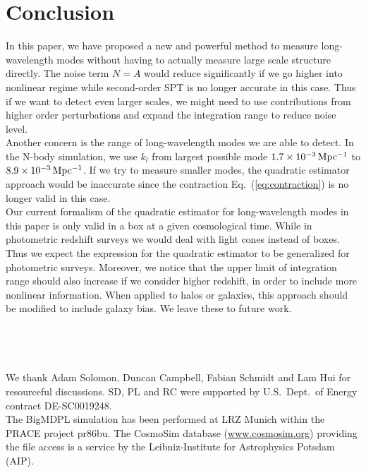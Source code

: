 \documentclass[prd,amsmath,amssymb,floatfix,superscriptaddress,nofootinbib,twocolumn]{revtex4-1}
\newcommand{\ec}[1]{Eq.~(\ref{eq:#1})}
\begin{document}
\section{Conclusion}\label{sec4}
In this paper, we have proposed a new and powerful method to measure long-wavelength modes without having to actually measure large scale structure directly. The noise term $N=A$ would reduce significantly if we go higher into nonlinear regime while second-order SPT is no longer accurate in this case. Thus if we want to detect even larger scales, we might need to use contributions from higher order perturbations and expand the integration range to reduce noise level. \\
Another concern is the range of long-wavelength modes we are able to detect. In the N-body simulation, we use $k_l$ from largest possible mode $1.7 \times 10^{-3} \, \rm Mpc^{-1}$ to $8.9\times 10^{-3} \, \rm Mpc^{-1}$. If we try to measure smaller modes, the quadratic estimator approach would be inaccurate since the contraction \ec{contraction} is no longer valid in this case.\\
Our current formalism of the quadratic estimator for long-wavelength modes in this paper is only valid in a box at a given cosmological time. While in photometric redshift surveys we would deal with light cones instead of boxes. Thus we expect the expression for the quadratic estimator to be generalized for photometric surveys. Moreover, we notice that the upper limit of integration range should also increase if we consider higher redshift, in order to include more nonlinear information. When applied to halos or galaxies, this approach should be modified to include galaxy bias. We leave these to future work.\\
\\ \\ \\ \\

\acknowledgements
\noindent We thank Adam Solomon, Duncan Campbell, Fabian Schmidt and Lam Hui for resourceful discussions.  SD, PL and RC were supported by U.S.\ Dept.\ of Energy contract DE-SC0019248.\\
The BigMDPL simulation has been performed at LRZ Munich within the PRACE project pr86bu. The CosmoSim database (\url{www.cosmosim.org}) providing the file access is a service by the Leibniz-Institute for Astrophysics Potsdam (AIP).
%

\end{document}
